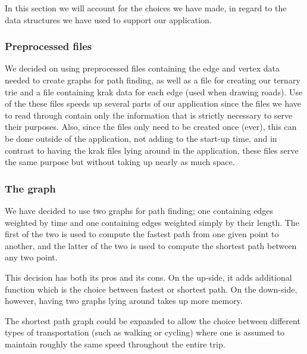 

In this section we will account for the choices we have made, in regard to the data structures we have used to support our application.

\subsubsection{Preprocessed files}

We decided on using preprocessed files containing the edge and vertex data needed to create graphs for path finding, as well as a file for creating our ternary trie and a file containing krak data for each edge (used when drawing roads). Use of the these files speeds up several parts of our application since the files we have to read through contain only the information that is strictly necessary to serve their purposes. Also, since the files only need to be created once (ever), this can be done outside of the application, not adding to the start-up time, and in contrast to having the krak files lying around in the application, these files serve the same purpose but without taking up nearly as much space.

\subsubsection{The graph}
We have decided to use two graphs for path finding; one containing edges weighted by time and one containing edges weighted simply by their length. The first of the two is used to compute the fastest path from one given point to another, and the latter of the two is used to compute the shortest path between any two point.

This decision has both its pros and its cons. On the up-side, it adds additional function which is the choice between fastest or shortest path. On the down-side, however, having two graphs lying around takes up more memory.

The shortest path graph could be expanded to allow the choice between different types of transportation (such as walking or cycling) where one is assumed to maintain roughly the same speed throughout the entire trip.
